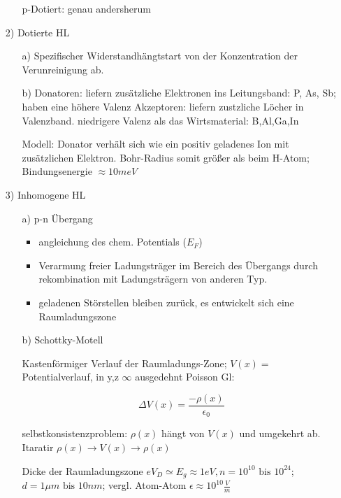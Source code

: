 \begin{enumerate}
\begin{enumerate}
p-Dotiert: genau andersherum



  \end{enumerate}


\item[2)] Dotierte HL

  \begin{enumerate}
  \item[a)] Spezifischer Widerstandhängtstart von der Konzentration der Verunreinigung ab.
  \item[b)] Donatoren: liefern zusätzliche Elektronen ins Leitungsband: P, As, Sb; haben eine höhere Valenz
Akzeptoren: liefern zustzliche Löcher in Valenzband. niedrigere Valenz als das Wirtsmaterial: B,Al,Ga,In

Modell: Donator verhält sich wie ein positiv geladenes Ion mit zusätzlichen Elektron. Bohr-Radius somit größer als beim H-Atom; Bindungsenergie \(\approx 10meV\)
  \end{enumerate}

\item[3)] Inhomogene HL

  \begin{enumerate}
  \item[a)] p-n Übergang


    \begin{itemize}
    \item angleichung des chem. Potentials (\(E_F\))
    \item Verarmung freier Ladungsträger im Bereich des Übergangs durch rekombination mit Ladungsträgern von anderen Typ.
    \item geladenen Störstellen bleiben zurück, es entwickelt sich eine Raumladungszone
    \end{itemize}

  \item[b)] Schottky-Motell

Kastenförmiger Verlauf der Raumladungs-Zone; \(V(x)=\)Potentialverlauf, in y,z \(\infty\) ausgedehnt Poisson Gl:

\[\Delta V(x) = \frac{-\rho(x)}{\epsilon_0}\]

selbstkonsistenzproblem: \(\rho(x)\) hängt von \(V(x)\) und umgekehrt ab. Itaratir \(\rho(x)\rightarrow V(x)\rightarrow \rho(x)\)

Dicke der Raumladungszone \(eV_D\simeq E_g\approx 1eV,n=10^{10}\text{ bis } 10^{24}\); \(d=1\mu m \text{ bis } 10nm\); vergl. Atom-Atom  \(\epsilon \approx 10^{10} \frac{V}{m}\)


\end{enumerate}
\end{enumerate}
